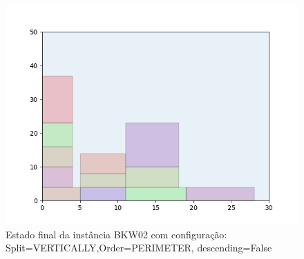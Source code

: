 \begin{figure}[H]
    \centering
    \caption[]{Estado final da instância BKW02 com configuração: Split=VERTICALLY,Order=PERIMETER, descending=False}
    \label{fig:bkw02-vertically-perimeter-false}
    \includegraphics[scale=0.5]{output/figures/bkw/bkw02/vertically/perimeter/false/00}
\end{figure}
